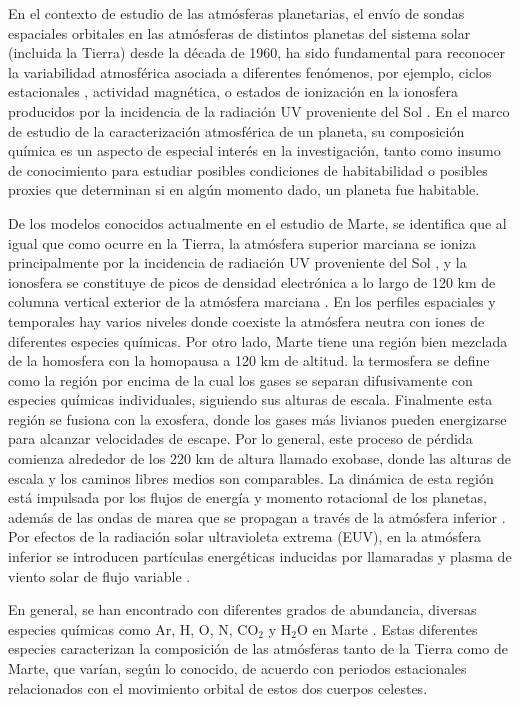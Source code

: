\documentclass[a4paper,alpha-refs]{eSpectra}
\begin{document}
En el contexto de estudio de las atm\'osferas planetarias, el env\'io de sondas espaciales orbitales en las atm\'osferas de distintos planetas del sistema solar (incluida la Tierra) desde la d\'ecada de 1960, ha sido fundamental para reconocer la variabilidad atmosf\'erica asociada a diferentes fen\'omenos, por ejemplo, ciclos estacionales \citep{Mars_seasonal_2002}, actividad magn\'etica, o estados de ionizaci\'on en la ionosfera producidos por la incidencia de la radiaci\'on UV proveniente del Sol \citep{Tian_2022}. En el marco de estudio de la caracterizaci\'on atmosf\'erica de un planeta, su composici\'on qu\'imica es un aspecto de especial inter\'es en la investigaci\'on, tanto como insumo de conocimiento para estudiar posibles condiciones de habitabilidad o posibles proxies que determinan si en alg\'un momento dado, un planeta fue habitable.

De los modelos conocidos actualmente en el estudio de Marte, se identifica que al igual que como ocurre en la Tierra, la atm\'osfera superior marciana se ioniza principalmente por la incidencia de radiaci\'on UV proveniente del Sol \citep{Tian_2022}, y la ionosfera se constituye de picos de densidad electr\'onica a lo largo de 120 km de columna vertical exterior de la atm\'osfera marciana \citep{Mars_ionosf_2011}. En los perfiles espaciales y temporales hay varios niveles donde coexiste la atmósfera neutra con iones de diferentes especies químicas. Por otro lado, Marte tiene una regi\'on bien mezclada de la homosfera con la homopausa a 120 km de altitud. la termosfera se define como la regi\'on por encima de la cual los gases se separan difusivamente con especies qu\'imicas individuales, siguiendo sus alturas de escala. Finalmente esta regi\'on se fusiona con la exosfera, donde los gases m\'as livianos pueden energizarse para alcanzar velocidades de escape. Por lo general, este proceso de p\'erdida comienza alrededor de los 220 km de altura llamado exobase, donde las alturas de escala y los caminos libres medios son comparables. La din\'amica de esta regi\'on est\'a impulsada por los flujos de energ\'ia y momento rotacional de los planetas, además de las ondas de marea que se propagan a trav\'es de la atm\'osfera inferior \citep{kamsali_2021}. Por efectos de la radiaci\'on solar ultravioleta extrema (EUV), en la atm\'osfera inferior se introducen part\'iculas energ\'eticas inducidas por llamaradas y plasma de viento solar de flujo variable \citep{petrosyan_mars_2011}.

En general, se han encontrado con diferentes grados de abundancia, diversas especies qu\'imicas como Ar, H, O, N, CO$_2$ y H$_2$O en Marte \citep{Mars_ab_2017, Mars_ab_2014, economou_2008}. Estas diferentes especies caracterizan la composici\'on de las atm\'osferas tanto de la Tierra como de Marte, que var\'ian, seg\'un lo conocido, de acuerdo con periodos estacionales relacionados con el movimiento orbital de estos dos cuerpos celestes. 
\end{document}
